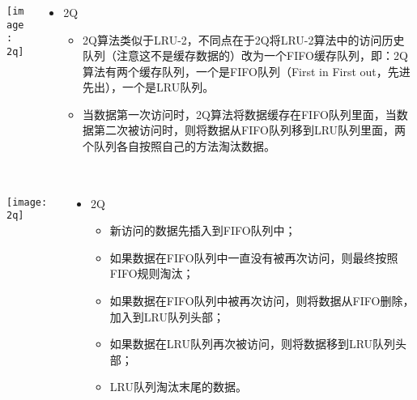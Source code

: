 \begin{frame}[plain]
	\frametitle{ }
	\begin{columns}
		\begin{column}{.4\textwidth}
			\centering
			\texttt{[image: 2q]}
		\end{column}
		
		\begin{column}{.6\textwidth}
			
			\begin{itemize}
				\item 2Q
				\begin{itemize}
					
					\item 2Q算法类似于LRU-2，不同点在于2Q将LRU-2算法中的访问历史队列（注意这不是缓存数据的）改为一个FIFO缓存队列，即：2Q算法有两个缓存队列，一个是FIFO队列（First in First out，先进先出），一个是LRU队列。
					\item 当数据第一次访问时，2Q算法将数据缓存在FIFO队列里面，当数据第二次被访问时，则将数据从FIFO队列移到LRU队列里面，两个队列各自按照自己的方法淘汰数据。
				\end{itemize}
			\end{itemize}
		\end{column}
		
		
	\end{columns}
\end{frame}


\begin{frame}[plain]
	\frametitle{ }
	\begin{columns}
		\begin{column}{.4\textwidth}
			\centering
			\texttt{[image: 2q]}
		\end{column}
		
		\begin{column}{.6\textwidth}
			
			\begin{itemize}
				\item 2Q
				\begin{itemize}
					
					\item 新访问的数据先插入到FIFO队列中；
					\item 如果数据在FIFO队列中一直没有被再次访问，则最终按照FIFO规则淘汰；
					\item 如果数据在FIFO队列中被再次访问，则将数据从FIFO删除，加入到LRU队列头部；
					\item 如果数据在LRU队列再次被访问，则将数据移到LRU队列头部；
					\item LRU队列淘汰末尾的数据。
				\end{itemize}
			\end{itemize}

		\end{column}
		
		
	\end{columns}
\end{frame}



